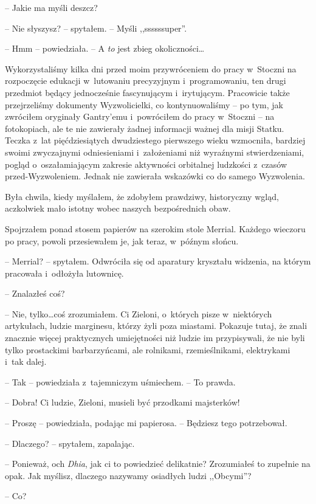 \documentclass[oneside,polish,11pt,sfheadings]{mwbk}
\begin{document}
-- Jakie ma myśli deszcz?

-- Nie słyszysz? -- spytałem. -- Myśli ,,ssssssuper''.

-- Hmm -- powiedziała. -- A \textit{to} jest zbieg okoliczności\ldots

Wykorzystaliśmy kilka dni przed moim przywróceniem do pracy w~Stoczni na
rozpoczęcie edukacji w~lutowaniu precyzyjnym i~programowaniu, ten drugi
przedmiot będący jednocześnie fascynującym i~irytującym. Pracowicie
także przejrzeliśmy dokumenty Wyzwolicielki, co kontynuowaliśmy -- po
tym, jak zwróciłem oryginały Gantry'emu i~powróciłem do pracy w~Stoczni
-- na fotokopiach, ale te nie zawierały żadnej informacji ważnej dla
misji Statku. Teczka z~lat pięćdziesiątych dwudziestego pierwszego wieku
wzmocniła, bardziej swoimi zwyczajnymi odniesieniami i~założeniami niż
wyraźnymi stwierdzeniami, pogląd o~oszałamiającym zakresie aktywności
orbitalnej ludzkości z~czasów przed-Wyzwoleniem. Jednak nie zawierała
wskazówki co do samego Wyzwolenia.

Była chwila, kiedy myślałem, że zdobyłem prawdziwy, historyczny wgląd,
aczkolwiek mało istotny wobec naszych bezpośrednich obaw.

Spojrzałem ponad stosem papierów na szerokim stole Merrial. Każdego
wieczoru po pracy, powoli przesiewałem je, jak teraz, w~późnym słońcu.

-- Merrial? -- spytałem. Odwróciła się od aparatury kryształu widzenia, na
którym pracowała i~odłożyła lutownicę.

-- Znalazłeś coś?

-- Nie, tylko\ldots coś zrozumiałem. Ci Zieloni, o~których pisze w~niektórych artykułach, ludzie marginesu, którzy żyli poza miastami.
Pokazuje tutaj, że znali znacznie więcej praktycznych umiejętności niż
ludzie im przypisywali, że nie byli tylko prostackimi barbarzyńcami, ale
rolnikami, rzemieślnikami, elektrykami i~tak dalej.

-- Tak -- powiedziała z~tajemniczym uśmiechem. -- To prawda.

-- Dobra! Ci ludzie, Zieloni, musieli być przodkami majsterków!

-- Proszę -- powiedziała, podając mi papierosa. -- Będziesz tego
potrzebował.

-- Dlaczego? -- spytałem, zapalając.

-- Ponieważ, och \textit{Dhia}, jak ci to powiedzieć delikatnie?
Zrozumiałeś to zupełnie na opak. Jak myślisz, dlaczego nazywamy
osiadłych ludzi ,,Obcymi''?

-- Co?
\end{document}
